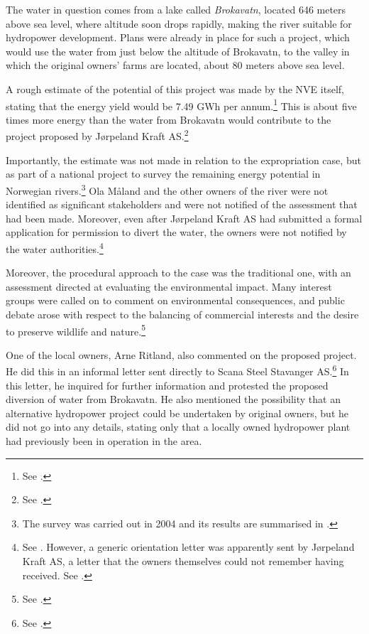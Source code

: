 The water in question comes from a lake called \emph{Brokavatn}, located 646 meters above sea level, where altitude soon drops rapidly, making the river suitable for hydropower development. Plans were already in place for such a project, which would use the water from just below the altitude of Brokavatn, to the valley in which the original owners' farms are located, about 80 meters above sea level. 

A rough estimate of the potential of this project was made by the NVE itself, stating that the energy yield would be 7.49 GWh per annum.\footnote{See \cite[16]{jorpeland09}.} This is about five times more energy than the water from Brokavatn would contribute to the project proposed by Jørpeland Kraft AS.\footnote{See \cite[19]{jorpeland09}.}

Importantly, the estimate was not made in relation to the expropriation case, but as part of a national project to survey the remaining energy potential in Norwegian rivers.\footnote{The survey was carried out in 2004 and its results are summarised in \cite{jensen04}.} Ola Måland and the other owners of the river were not identified as significant stakeholders and were not notified of the assessment that had been made. Moreover, even after Jørpeland Kraft AS had submitted a formal application for permission to divert the water, the owners were not notified by the water authorities.\footnote{See \cite[16]{jorpeland09}. However, a generic orientation letter was apparently sent by Jørpeland Kraft AS, a letter that the owners themselves could not remember having received. See \cite[5|8]{jorpeland11a}.}

Moreover, the procedural approach to the case was the traditional one, with an assessment directed at evaluating the environmental impact. Many interest groups were called on to comment on environmental consequences, and public debate arose with respect to the balancing of commercial interests and the desire to preserve wildlife and nature.\footnote{See \cite[19]{jorpeland09}.}

One of the local owners, Arne Ritland, also commented on the proposed project. He did this in an informal letter sent directly to Scana Steel Stavanger AS.\footnote{See \cite[17]{jorpeland09}.} In this letter, he inquired for further information and protested the proposed diversion of water from Brokavatn. He also mentioned the possibility that an alternative hydropower project could be undertaken by original owners, but he did not go into any details, stating only that a locally owned hydropower plant had previously been in operation in the area. 

